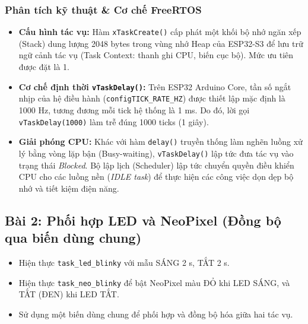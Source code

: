 \subsubsection{Phân tích kỹ thuật \& Cơ chế FreeRTOS}
\begin{itemize}
    \item \textbf{Cấu hình tác vụ:} Hàm \texttt{xTaskCreate()} cấp phát một khối bộ nhớ ngăn xếp (Stack) dung lượng 2048 bytes trong vùng nhớ Heap của ESP32-S3 để lưu trữ ngữ cảnh tác vụ (Task Context: thanh ghi CPU, biến cục bộ). Mức ưu tiên được đặt là 1.
    \item \textbf{Cơ chế định thời \texttt{vTaskDelay()}:} Trên ESP32 Arduino Core, tần số ngắt nhịp của hệ điều hành (\texttt{configTICK\_RATE\_HZ}) được thiết lập mặc định là 1000 Hz, tương đương mỗi tick hệ thống là 1 ms. Do đó, lời gọi \texttt{vTaskDelay(1000)} làm trễ đúng 1000 ticks (1 giây).
    \item \textbf{Giải phóng CPU:} Khác với hàm \texttt{delay()} truyền thống làm nghẽn luồng xử lý bằng vòng lặp bận (Busy-waiting), \texttt{vTaskDelay()} lập tức đưa tác vụ vào trạng thái \textit{Blocked}. Bộ lập lịch (Scheduler) lập tức chuyển quyền điều khiển CPU cho các luồng nền (\textit{IDLE task}) để thực hiện các công việc dọn dẹp bộ nhớ và tiết kiệm điện năng.
\end{itemize}

\newpage
\subsection{Bài 2: Phối hợp LED và NeoPixel (Đồng bộ qua biến dùng chung)}

\begin{tcolorbox}[
    enhanced, colback=black!2, colframe=black!60, boxrule=1pt, arc=2.5mm, drop shadow,
    attach boxed title to top left={xshift=4mm, yshift=-3mm},
    boxed title style={enhanced, colback=black!85, colframe=black!85, boxrule=1pt, arc=2.5mm, drop shadow, left=6pt, right=6pt, top=2pt, bottom=2pt},
    title=\textcolor{white}{\large\textbf{Yêu cầu đề bài (Trích phiếu bài tập)}}
]
\bfseries
\vspace{0.2cm}
\begin{itemize}
    \item Hiện thực \texttt{task\_led\_blinky} với mẫu SÁNG 2 s, TẮT 2 s.
    \item Hiện thực \texttt{task\_neo\_blinky} để bật NeoPixel màu ĐỎ khi LED SÁNG, và TẮT (ĐEN) khi LED TẮT.
    \item Sử dụng một biến dùng chung để phối hợp và đồng bộ hóa giữa hai tác vụ.
\end{itemize}
\end{tcolorbox}


